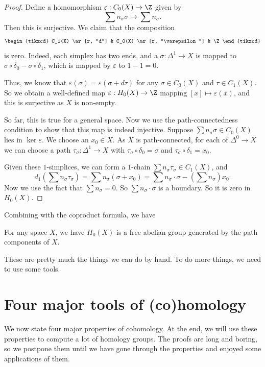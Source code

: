 \documentclass[a4paper]{article}
\theoremstyle{definition}
\begin{document}
\begin{proof}
  Define a homomorphism $\varepsilon: C_0(X) \to \Z$ given by
  \[
    \sum n_\sigma \sigma \mapsto \sum n_\sigma.
  \]
  Then this is surjective. We claim that the composition
  \[
    \begin{tikzcd}
      C_1(X) \ar[r, "d"] & C_0(X) \ar[r, "\varepsilon"] & \Z
    \end{tikzcd}
  \]
  is zero. Indeed, each simplex has two ends, and a $\sigma: \Delta^1 \to X$ is mapped to $\sigma \circ \delta_0 - \sigma \circ \delta_1$, which is mapped by $\varepsilon$ to $1 - 1 = 0$.

  Thus, we know that $\varepsilon(\sigma) = \varepsilon (\sigma + d \tau)$ for any $\sigma \in C_0(X)$ and $\tau \in C_1(X)$. So we obtain a well-defined map $\varepsilon: H_0(X) \to \Z$ mapping $[x] \mapsto \varepsilon(x)$, and this is surjective as $X$ is non-empty.

  So far, this is true for a general space. Now we use the path-connectedness condition to show that this map is indeed injective. Suppose $\sum n_\sigma \sigma \in C_0(X)$ lies in $\ker \varepsilon$. We choose an $x_0 \in X$. As $X$ is path-connected, for each of $\Delta^0 \to X$ we can choose a path $\tau_\sigma: \Delta^1 \to X$ with $\tau_\sigma \circ \delta_0 = \sigma$ and $\tau_\sigma \circ \delta_1 = x_0$.

  Given these $1$-simplices, we can form a $1$-chain $\sum n_\sigma \tau_\sigma \in C_1(X)$, and
  \[
    d_1\left(\sum n_\sigma \tau_\sigma\right)= \sum n_\sigma(\sigma + x_0) = \sum n_\sigma \cdot \sigma - \left(\sum n_\sigma\right) x_0.
  \]
  Now we use the fact that $\sum n_\sigma = 0$. So $\sum n_\sigma \cdot \sigma$ is a boundary. So it is zero in $H_0(X)$.
\end{proof}

Combining with the coproduct formula, we have
\begin{prop}
  For any space $X$, we have $H_0(X)$ is a free abelian group generated by the path components of $X$.
\end{prop}
These are pretty much the things we can do by hand. To do more things, we need to use some tools.

\section{Four major tools of (co)homology}
We now state four major properties of cohomology. At the end, we will use these properties to compute a lot of homology groups. The proofs are long and boring, so we postpone them until we have gone through the properties and enjoyed some applications of them.
\end{document}
